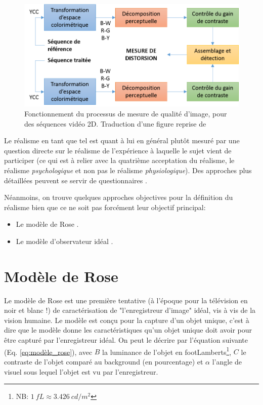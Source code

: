 	\begin{figure}
		\centering
		\includegraphics[scale=1]{Figures/ImageQualityWinkler}
		\caption{Fonctionnement du processus de mesure de qualité d'image, pour des séquences vidéo 2D. Traduction d'une figure reprise de \cite{winkler_quality_2000}}
		\label{fig:quality_process}
	\end{figure}
	
	\par Le réalisme en tant que tel est quant à lui en général plutôt mesuré par une question directe sur le réalisme de l'expérience à laquelle le sujet vient de participer (ce qui est à relier avec la quatrième acceptation du réalisme, le réalisme \textit{psychologique} et non pas le réalisme \textit{physiologique}). Des approches plus détaillées peuvent se servir de questionnaires \citep{fucentese_evaluation_2015, fiard_initial_2014}.
	
	\par Néanmoins, on trouve quelques approches objectives pour la définition du réalisme bien que ce ne soit pas forcément leur objectif principal:	
		\begin{itemize}
			\item Le modèle de Rose \citep{rose_sensitivity_1948,burgess_rose_1999}.
			\item Le modèle d'observateur idéal \citep{geisler_ideal_2003}.
		\end{itemize}
		
		\section*{Modèle de Rose}		
		\par Le modèle de Rose est une première tentative (à l'époque pour la télévision en noir et blanc !) de caractérisation de "l'enregistreur d'image" idéal, vis à vis de la vision humaine. Le modèle est conçu pour la capture d'un objet unique, c'est à dire que le modèle donne les caractéristiques qu'un objet unique doit avoir pour être capturé par l'enregistreur idéal. On peut le décrire par l'équation  suivante (Eq. \ref{eq:modèle_rose}), avec $B$ la luminance de l'objet en footLamberts\footnote{NB: $1~fL \approx 3.426~cd/m^2$}, $C$ le contraste de l'objet comparé au background (en pourcentage) et $\alpha$ l'angle de visuel sous lequel l'objet est vu par l'enregistreur.
		
